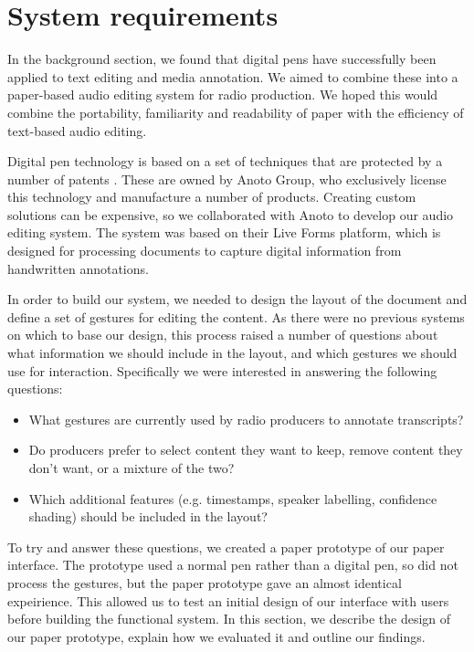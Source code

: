 

\section{System requirements}\label{sec:paper-requirements}

In the background section, we found that digital pens have successfully been applied to text editing and media
annotation. We aimed to combine these into a paper-based audio editing system for radio production. We hoped this
would combine the portability, familiarity and readability of paper with the efficiency of text-based audio editing. 

Digital pen technology is based on a set of techniques that are protected by a number of patents \citep{Fahraeus2003}.
These are owned by Anoto Group, who exclusively license this technology and manufacture a number of products. Creating
custom solutions can be expensive, so we collaborated with Anoto to develop our audio editing system. The system was
based on their Live Forms platform, which is designed for processing documents to capture digital information from
handwritten annotations.

In order to build our system, we needed to design the layout of the document and define a set of gestures for
editing the content.  As there were no previous systems on which to base our design, this process raised a number of
questions about what information we should include in the layout, and which gestures we should use for interaction.
Specifically we were interested in answering the following questions:

{\singlespacing
\begin{itemize}
  \item What gestures are currently used by radio producers to annotate transcripts?
  \item Do producers prefer to select content they want to keep, remove content they don't want, or a mixture of the
    two?
  \item Which additional features (e.g. timestamps, speaker labelling, confidence shading) should be included in the
    layout?
\end{itemize}
}

To try and answer these questions, we created a paper prototype of our paper interface. The prototype used a normal pen
rather than a digital pen, so did not process the gestures, but the paper prototype gave an almost identical
expeirience. This allowed us to test an initial design of our interface with users before building the functional
system.  In this section, we describe the design of our paper prototype, explain how we evaluated it and outline our
findings.


